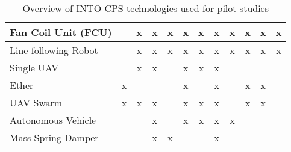 \begin{table}[ht]
\begin{centering}
\begin{tabular}{|l|c|c|c|c|c|c|c|c|c|c|c|}
Fan Coil Unit (FCU)		& &x&x&x&x&x&x&x&x&x&x\\ \hline
Line-following Robot		& &x&x&x&x&x&x&x&x&x&x\\ \hline
Single UAV			& &x&x& &x&x&x& & & &\\ \hline
Ether				&x& & & &x& &x& &x&x& \\ \hline
UAV Swarm			&x&x&x& &x&x&x& &x&x&\\ \hline
Autonomous Vehicle			& & &x& &x&x&x&x& & &\\ \hline
Mass Spring Damper			& & &x&x& & &x& & & &\\ \hline
\end{tabular}
\caption{Overview of INTO-CPS technologies used for pilot studies}
\label{tab:into_examples}
\end{centering}
\end{table}